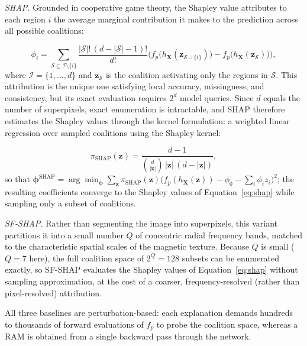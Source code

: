 \documentclass[final,5p,times,twocolumn]{elsarticle}
\begin{document}
\emph{SHAP.} Grounded in cooperative game theory, the Shapley value attributes to each region $i$ the average marginal contribution it makes to the prediction across all possible coalitions:

\begin{equation}\label{eq:shap}
\phi_i = \sum_{\mathcal{S} \subseteq \mathcal{I} \setminus \{i\}} \frac{|\mathcal{S}|!\,(d - |\mathcal{S}| - 1)!}{d!} \Big( f_p\big(h_{\mathbf{X}}(\mathbf{z}_{\mathcal{S} \cup \{i\}})\big) - f_p\big(h_{\mathbf{X}}(\mathbf{z}_{\mathcal{S}})\big) \Big),
\end{equation}
where $\mathcal{I} = \{1, \dots, d\}$ and $\mathbf{z}_{\mathcal{S}}$ is the coalition activating only the regions in $\mathcal{S}$. This attribution is the unique one satisfying local accuracy, missingness, and consistency, but its exact evaluation requires $2^{d}$ model queries. Since $d$ equals the number of superpixels, exact enumeration is intractable, and SHAP therefore estimates the Shapley values through the kernel formulation: a weighted linear regression over sampled coalitions using the Shapley kernel:

\begin{equation}\label{eq:kernelshap}
\pi_{\text{SHAP}}(\mathbf{z}) = \frac{d - 1}{\binom{d}{|\mathbf{z}|}\,|\mathbf{z}|\,(d - |\mathbf{z}|)},
\end{equation}
so that $\boldsymbol{\phi}^{\text{SHAP}} = \arg\min_{\boldsymbol{\phi}} \sum_{\mathbf{z}} \pi_{\text{SHAP}}(\mathbf{z}) \big( f_p(h_{\mathbf{X}}(\mathbf{z})) - \phi_0 - \sum_i \phi_i z_i \big)^2$; the resulting coefficients converge to the Shapley values of Equation~\ref{eq:shap} while sampling only a subset of coalitions.

\emph{SF-SHAP.} Rather than segmenting the image into superpixels, this variant partitions it into a small number $Q$ of concentric radial frequency bands, matched to the characteristic spatial scales of the magnetic texture. Because $Q$ is small ($Q=7$ here), the full coalition space of $2^{Q}=128$ subsets can be enumerated exactly, so SF-SHAP evaluates the Shapley values of Equation~\ref{eq:shap} without sampling approximation, at the cost of a coarser, frequency-resolved (rather than pixel-resolved) attribution.

All three baselines are perturbation-based: each explanation demands hundreds to thousands of forward evaluations of $f_p$ to probe the coalition space, whereas a RAM is obtained from a single backward pass through the network.
\end{document}
